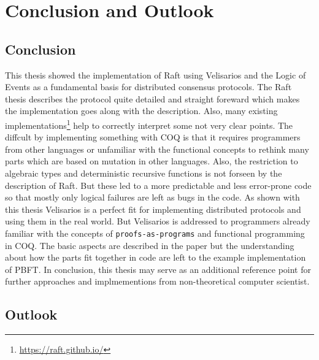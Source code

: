 %
\section{Conclusion and Outlook}
\label{sec_conclusion}


\subsection{Conclusion}

This thesis showed the implementation of Raft using
Velisarios and the Logic of Events as a fundamental
basis for distributed consensus protocols. The Raft
thesis describes the protocol quite detailed and
straight foreward which makes the implementation
goes along with the description. Also, many existing
implementations\footnote{\url{https://raft.github.io/}}
help to correctly interpret some not very clear points.
The diffcult by implementing something with COQ is that
it requires programmers from other languages or unfamiliar
with the functional concepts to rethink many parts which
are based on mutation in other languages. Also, the
restriction to algebraic types and deterministic recursive
functions is not forseen by the description of Raft.
But these led to a more predictable and less error-prone
code so that mostly only logical failures are left as
bugs in the code. As shown with this thesis Velisarios
is a perfect fit for implementing distributed protocols
and using them in the real world. But Velisarios is
addressed to programmers already familiar with the
concepts of \texttt{proofs-as-programs} and functional
programming in COQ. The basic aspects are described
in the paper but the understanding about how the
parts fit together in code are left to the example
implementation of PBFT. In conclusion, this thesis
may serve as an additional reference point for
further approaches and implmementions from non-theoretical
computer scientist.

\subsection{Outlook}

